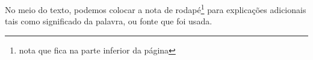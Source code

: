 No meio do texto, podemos colocar a nota de rodapé\footnote{nota que fica na
parte inferior da página} para explicações adicionais tais como significado da
palavra, ou fonte que foi usada.
